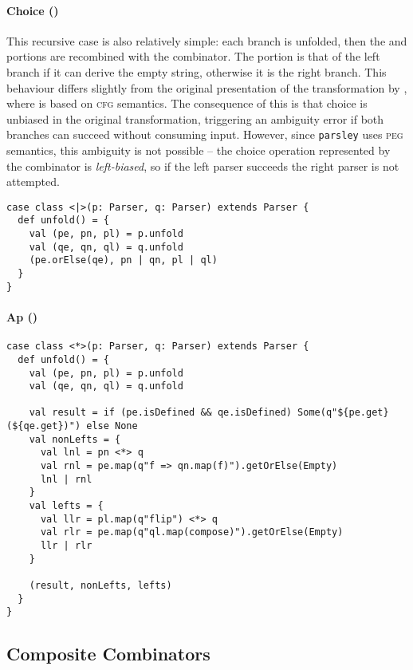 \documentclass[../../main.tex]{subfiles}
\begin{document}
\paragraph{Choice (\scala{<|>})}
This recursive case is also relatively simple: each branch is unfolded, then the  and  portions are recombined with the \scala{|} combinator.
The  portion is that of the left branch if it can derive the empty string, otherwise it is the right branch.
This behaviour differs slightly from the original presentation of the transformation by \textcite{baars_leftrec_2004}, where \scala{|} is based on \textsc{cfg} semantics.
The consequence of this is that choice is unbiased in the original transformation, triggering an ambiguity error if both branches can succeed without consuming input.
However, since \texttt{parsley} uses \textsc{peg} semantics, this ambiguity is not possible --
the choice operation represented by the \scala{|} combinator is \emph{left-biased}, so if the left parser succeeds the right parser is not attempted.

\begin{verbatim}
case class <|>(p: Parser, q: Parser) extends Parser {
  def unfold() = {
    val (pe, pn, pl) = p.unfold
    val (qe, qn, ql) = q.unfold
    (pe.orElse(qe), pn | qn, pl | ql)
  }
}
\end{verbatim}

\paragraph{Ap (\scala{<*>})}
\begin{verbatim}
case class <*>(p: Parser, q: Parser) extends Parser {
  def unfold() = {
    val (pe, pn, pl) = p.unfold
    val (qe, qn, ql) = q.unfold

    val result = if (pe.isDefined && qe.isDefined) Some(q"${pe.get}(${qe.get})") else None
    val nonLefts = {
      val lnl = pn <*> q
      val rnl = pe.map(q"f => qn.map(f)").getOrElse(Empty)
      lnl | rnl
    }
    val lefts = {
      val llr = pl.map(q"flip") <*> q
      val rlr = pe.map(q"ql.map(compose)").getOrElse(Empty)
      llr | rlr
    }

    (result, nonLefts, lefts)
  }
}
\end{verbatim}

\subsection{Composite Combinators}
\end{document}
